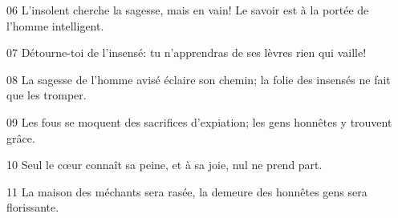 
06 L’insolent cherche la sagesse, mais en vain! Le savoir est à la portée de l’homme intelligent.

07 Détourne-toi de l’insensé: tu n’apprendras de ses lèvres rien qui vaille!

08 La sagesse de l’homme avisé éclaire son chemin; la folie des insensés ne fait que les tromper.

09 Les fous se moquent des sacrifices d’expiation; les gens honnêtes y trouvent grâce.

10 Seul le cœur connaît sa peine, et à sa joie, nul ne prend part.

11 La maison des méchants sera rasée, la demeure des honnêtes gens sera florissante.
